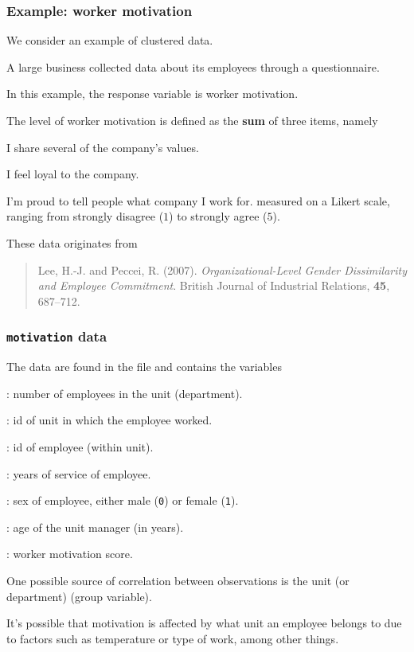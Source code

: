 \documentclass{beamer}
\begin{document}
\begin{frame}[fragile]
\frametitle{Example: worker motivation}
We consider an example of clustered data.
\bi
\item  A large business collected data about its employees through a questionnaire. 
\item In this example, the response variable is \alert{worker motivation}. 
\item The level of worker motivation is defined as the \textbf{sum} of three items, namely
\bi

\item I share several of the company's values.
\item I feel loyal to the company.
\item I'm proud to tell people what company I work for.
\ei
measured on a Likert scale, ranging from strongly disagree ($1$) to strongly agree ($5$).
\item These data originates from

\begin{quote}
Lee, H.-J. and Peccei, R. (2007). \textsl{Organizational-Level Gender Dissimilarity and
Employee Commitment}. British Journal of Industrial Relations, \textbf{45}, 687--712.
\end{quote}
\ei
\end{frame}

\begin{frame}[fragile]
\frametitle{\texttt{motivation} data}
 The data are found in the file  and contains the variables%
\bi

\item {}: number of employees in the unit (department).
\item {}: id of unit in which the employee worked.
\item  {}: id of employee (within unit).
\item {}: years of service of employee.
\item {}: sex of employee, either male (\texttt{0}) or female (\texttt{1}).
\item  {}: age of the unit manager (in years).
\item {}: worker motivation score.
\ei

\bi
\item  One possible source of correlation between observations is the \alert{unit (or department)} (group variable). 
\item It's possible that motivation is affected by what unit an employee belongs to due to factors such as temperature or type of work, among other things.
\ei
\end{frame}
\end{document}
